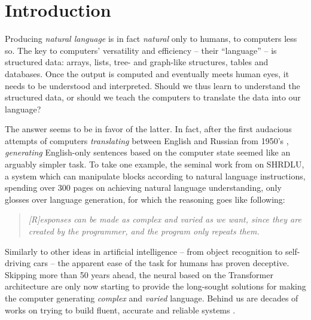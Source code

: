 \documentclass[12pt,notitlepage,a4paper,openright]{report}
\begin{document}
\cleardoublepage{}
\tableofcontents %

\cleardoublepage{}
\renewcommand{\chapterheadstartvskip}{\vspace*{-10mm}} %

%
%
\renewcommand{\thepage}{\arabic{page}}
\setcounter{page}{1}




\sloppy
% 
% 
% 

\chapter{Introduction}
Producing \textit{natural language} is in fact \textit{natural} only to humans, to computers less so. The key to computers' versatility and efficiency -- their ``language'' -- is structured data: arrays, lists, tree- and graph-like structures, tables and databases. Once the output is computed and eventually meets human eyes,  it needs to be understood and interpreted. Should we thus learn to understand the structured data, or should we teach the computers to translate the data into our language?

The answer seems to be in favor of the latter.
In fact, after the first audacious attempts of computers \textit{translating} between English and Russian from 1950's \cite{sheridan1955research}, \textit{generating} English-only sentences based on the computer state seemed like an arguably simpler task. To take one example, the seminal work from \citet{winograd1971procedures} on SHRDLU, a system which can manipulate blocks according to natural language instructions, spending over 300 pages on achieving natural language understanding, only glosses over language generation, for which the reasoning goes like following:
\begin{quote}
  \textit{[R]esponses can be made as complex and varied as we want, since they are created by the programmer, and the program only repeats them.} \cite[p.384]{winograd1971procedures}
\end{quote}

Similarly to other ideas in artificial intelligence -- from object recognition \cite{papert1966summer} to self-driving cars \cite{autonomouscars} -- the apparent ease of the task for humans has proven deceptive. Skipping more than 50 years ahead, the neural  based on the Transformer architecture \cite{vaswani2017attention} are only now starting to provide the long-sought solutions for making the computer generating \textit{complex} and \textit{varied} language. Behind us are decades of works on trying to build fluent, accurate and reliable  systems \cite{reiterBuildingAppliedNatural1997,gattSurveyStateArt2018}.
\end{document}
